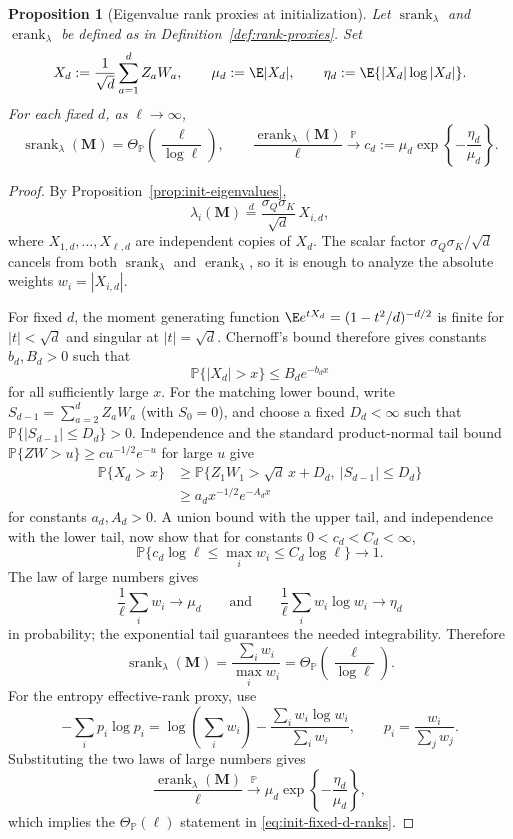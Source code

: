 \documentclass{article}
\newcommand{\Prob}{\mathbb{P}}
\newcommand{\srank}{\operatorname{srank}}
\newcommand{\erank}{\operatorname{erank}}
\newcommand{\bM}{\mathbf{M}}
\newtheorem{proposition}[theorem]{Proposition}
\theoremstyle{definition}
\theoremstyle{remark}
\begin{document}
\begin{proposition}[Eigenvalue rank proxies at initialization]
Let $\srank_\lambda$ and $\erank_\lambda$ be defined as in
Definition~\ref{def:rank-proxies}.  Set
\[
    X_d:=\frac{1}{\sqrt d}\sum_{a=1}^d Z_aW_a,\qquad
    \mu_d:=\E |X_d|,\qquad
    \eta_d:=\E\{|X_d|\log |X_d|\}.
\]
For each fixed $d$, as $\ell\to\infty$,
\begin{equation}
    \srank_\lambda(\bM)=\Theta_{\Prob}\left(\frac{\ell}{\log\ell}\right),
    \qquad
    \frac{\erank_\lambda(\bM)}{\ell}
    \xrightarrow{\Prob}
    c_d:=
    \mu_d\exp\left\{-\frac{\eta_d}{\mu_d}\right\}.
    \label{eq:init-fixed-d-rank-constant}
\end{equation}
\label{prop:init-eigenvalue-ranks}
\end{proposition}

\begin{proof}
By Proposition~\ref{prop:init-eigenvalues},
\[
    \lambda_i(\bM)
    \stackrel{d}{=}
    \frac{\sigma_Q\sigma_K}{\sqrt d}\,X_{i,d},
\]
where $X_{1,d},\ldots,X_{\ell,d}$ are independent copies of $X_d$.  The scalar
factor $\sigma_Q\sigma_K/\sqrt d$ cancels from both $\srank_\lambda$ and
$\erank_\lambda$, so it is enough to analyze the absolute weights
$w_i=|X_{i,d}|$.

For fixed $d$, the moment generating function
$\E e^{tX_d}=(1-t^2/d)^{-d/2}$ is finite for $|t|<\sqrt d$ and singular at
$|t|=\sqrt d$.  Chernoff's bound therefore gives constants $b_d,B_d>0$
such that
\[
    \Prob\{|X_d|>x\}\leq B_de^{-b_dx}
\]
for all sufficiently large $x$.  For the matching lower bound, write
$S_{d-1}=\sum_{a=2}^d Z_aW_a$ (with $S_0=0$), and choose a fixed $D_d<\infty$
such that $\Prob\{|S_{d-1}|\leq D_d\}>0$.  Independence and the standard
product-normal tail bound
$\Prob\{ZW>u\}\geq c u^{-1/2}e^{-u}$ for large $u$ give
\[
\begin{aligned}
\Prob\{X_d>x\}
&\geq
\Prob\{Z_1W_1>\sqrt d\,x+D_d,\ |S_{d-1}|\leq D_d\}\\
&\geq a_d x^{-1/2}e^{-A_dx}
\end{aligned}
\]
for constants $a_d,A_d>0$.  A union bound with the upper tail, and
independence with the lower tail, now show that for constants
$0<c_d<C_d<\infty$,
\[
    \Prob\{c_d\log\ell\leq \max_i w_i\leq C_d\log\ell\}\to1.
\]
The law of large numbers gives
\[
    \frac1\ell\sum_iw_i\to\mu_d
    \qquad\text{and}\qquad
    \frac1\ell\sum_iw_i\log w_i\to\eta_d
\]
in probability; the exponential tail guarantees the needed integrability.
Therefore
\[
    \srank_\lambda(\bM)
    =
    \frac{\sum_iw_i}{\max_iw_i}
    =
    \Theta_{\Prob}\left(\frac{\ell}{\log\ell}\right).
\]
For the entropy effective-rank proxy, use
\[
    -\sum_i p_i\log p_i
    =
    \log\left(\sum_iw_i\right)
    -
    \frac{\sum_iw_i\log w_i}{\sum_iw_i},
    \qquad p_i=\frac{w_i}{\sum_jw_j}.
\]
Substituting the two laws of large numbers gives
\[
    \frac{\erank_\lambda(\bM)}{\ell}
    \xrightarrow{\Prob}
    \mu_d\exp\left\{-\frac{\eta_d}{\mu_d}\right\},
\]
which implies the $\Theta_{\Prob}(\ell)$ statement in
\eqref{eq:init-fixed-d-ranks}.

\end{proof}
\end{document}
